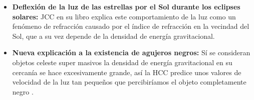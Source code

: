 \begin{itemize}
     \item \textbf{Deflexión de la luz de las estrellas por el Sol durante los eclipses solares:} \ac{JCC} en su libro \cite{bib:el-libro} explica este comportamiento de la luz como un fenómeno de refracción causado por el índice de refracción en la vecindad del Sol, que a su vez depende de la densidad de energía gravitacional.

     \item \textbf{Nueva explicación a la existencia de agujeros negros:} Sí se consideran objetos celeste super masivos la densidad de energía gravitacional en su cercanía se hace excesivamente grande, así la \ac{HCC} predice unos valores de velocidad de la luz tan pequeños que percibiríamos el objeto completamente negro \cite{propiedadesdelespaciovacio}.
     
 \end{itemize}




